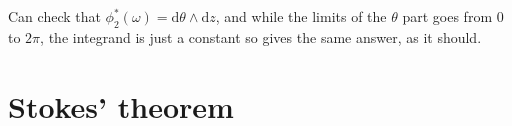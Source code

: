 \documentclass[letter-paper]{tufte-book}
\newenvironment{example}[1][Example]{\begin{trivlist}
\item[\hskip \labelsep {\bfseries #1}]}{\end{trivlist}}
\begin{document}
\begin{example}
  Can check that $\phi_2^*(\omega) = \mathrm{d}\theta \wedge \mathrm{d}z$, and while the limits of the $\theta$ part goes from $0$ to $2\pi$, the integrand is just a constant so gives the same answer, as it should.
\end{example}


\section{Stokes' theorem}








\mainmatter




%


\end{document}
